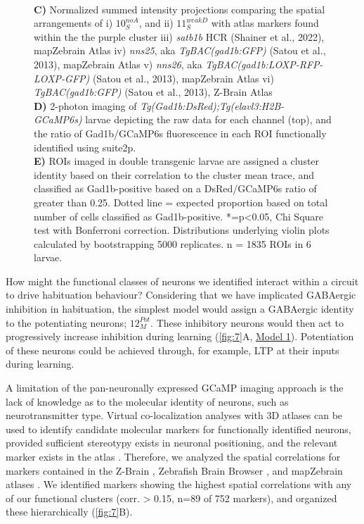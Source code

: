 \documentclass[9pt,lineno]{RandlettLab_elife}
\begin{document}
\begin{figure}
\begin{fullwidth}
\begin{center}
{\\ \textbf{C)} Normalized summed intensity projections comparing the spatial arrangements of i) $10_{S}^{noA}$, and ii) $11_{S}^{weakD}$
with atlas markers found within the the purple cluster
iii) \emph{satb1b} HCR (Shainer et al., 2022), mapZebrain Atlas
iv) \emph{nns25}, aka \emph{TgBAC(gad1b:GFP)} (Satou et al., 2013), mapZebrain Atlas
v) \emph{nns26}, aka \emph{TgBAC(gad1b:LOXP-RFP-LOXP-GFP)} (Satou et al., 2013), mapZebrain Atlas
vi) \emph{TgBAC(gad1b:GFP)} (Satou et al., 2013), Z-Brain Atlas
\\ \textbf{D)} 2-photon imaging of \emph{Tg(Gad1b:DsRed);Tg(elavl3:H2B-GCaMP6s)} larvae depicting the raw data for each channel (top), and the ratio of Gad1b/GCaMP6s fluorescence in each ROI functionally identified using suite2p. 
\\ \textbf{E)} ROIs imaged in double transgenic larvae are assigned a cluster identity based on their correlation to the cluster mean trace, and classified as Gad1b-positive based on a DsRed/GCaMP6s ratio of greater than 0.25. Dotted line = expected proportion based on total number of cells classified as Gad1b-positive. *=p<0.05, Chi Square test with Bonferroni correction. Distributions underlying violin plots calculated by bootstrapping 5000 replicates. n = 1835 ROIs in 6 larvae. 
}
\label{fig:7}
\end{center}
\end{fullwidth}
\end{figure}

How might the functional classes of neurons we identified interact within a circuit to drive habituation behaviour? Considering that we have implicated GABAergic inhibition in habituation, the simplest model would assign a GABAergic identity to the potentiating neurons; $12_{M}^{Pot}$. These inhibitory neurons would then act to progressively increase inhibition during learning (\autoref{fig:7}A, \underline{Model 1}). Potentiation of these neurons could be achieved through, for example, LTP at their inputs during learning. 

A limitation of the pan-neuronally expressed GCaMP imaging approach is the lack of knowledge as to the molecular identity of neurons, such as neurotransmitter type. Virtual co-localization analyses with 3D atlases can be used to identify candidate molecular markers for functionally identified neurons, provided sufficient stereotypy exists in neuronal positioning, and the relevant marker exists in the atlas \cite{Dunn2016-vt, Randlett2015-hy}. Therefore, we analyzed the spatial correlations for markers contained in the Z-Brain \cite{Randlett2015-hy}, Zebrafish Brain Browser \cite{Gupta2018-ik, Marquart2017-na, Tabor2018-bw}, and mapZebrain atlases \cite{Kunst2018-az, Shainer2022-sn}. We identified markers showing the highest spatial correlations with any of our functional clusters (corr. > 0.15, n=89 of 752 markers), and organized these hierarchically (\autoref{fig:7}B).
\end{document}
